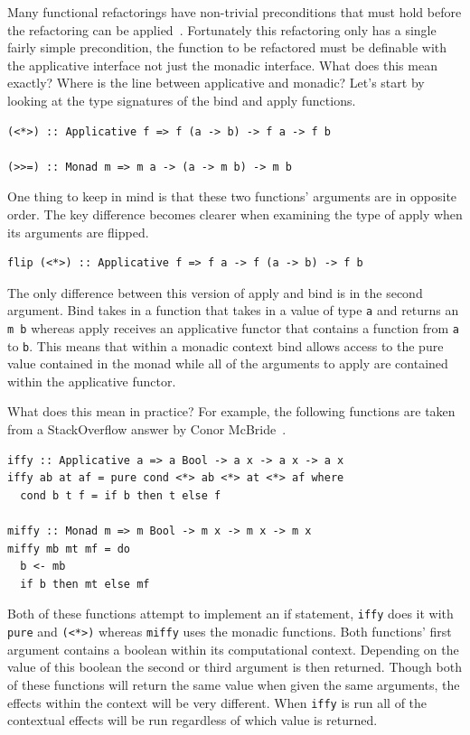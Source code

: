 Many functional refactorings have non-trivial preconditions that must hold before the refactoring can be applied~\citep{refacTools}. Fortunately this refactoring only has a single fairly simple precondition, the function to be refactored must be definable with the applicative interface not just the monadic interface. What does this mean exactly? Where is the line between applicative and monadic? Let's start by looking at the type signatures of the bind and apply functions.

\begin{lstlisting}[frame=tblr]
(<*>) :: Applicative f => f (a -> b) -> f a -> f b

(>>=) :: Monad m => m a -> (a -> m b) -> m b
\end{lstlisting}  

One thing to keep in mind is that these two functions' arguments are in opposite order. The key difference becomes clearer when examining the type of apply when its arguments are flipped.

\begin{lstlisting}[frame=tblr]
flip (<*>) :: Applicative f => f a -> f (a -> b) -> f b
\end{lstlisting}

The only difference between this version of apply and bind is in the second argument. Bind takes in a function that takes in a value of type \texttt{a} and returns an \texttt{m b} whereas apply receives an applicative functor that contains a function from \texttt{a} to \texttt{b}. This means that within a monadic context bind allows access to the pure value contained in the monad while all of the arguments to apply are contained within the applicative functor.

What does this mean in practice? For example, the following functions are taken from a StackOverflow answer by Conor McBride~\citep{soApp}.

\begin{lstlisting}[frame=tblr]
iffy :: Applicative a => a Bool -> a x -> a x -> a x
iffy ab at af = pure cond <*> ab <*> at <*> af where
  cond b t f = if b then t else f

miffy :: Monad m => m Bool -> m x -> m x -> m x
miffy mb mt mf = do
  b <- mb
  if b then mt else mf
\end{lstlisting} 

Both of these functions attempt to implement an if statement, \texttt{iffy} does it with \texttt{pure} and \texttt{(<*>)} whereas \texttt{miffy} uses the monadic functions. Both functions' first argument contains a boolean within its computational context. Depending on the value of this boolean the second or third argument is then returned. Though both of these functions will return the same value when given the same arguments, the effects within the context will be very different. When \texttt{iffy} is run all of the contextual effects will be run regardless of which value is returned.

